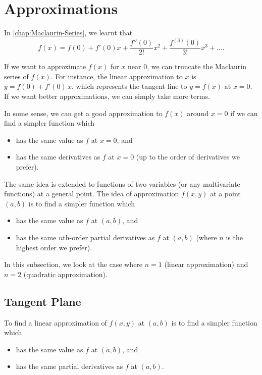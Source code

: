 \section{Approximations}

In \SS\ref{chap:Maclaurin-Series}, we learnt that \[f(x) = f(0) + f'(0) x + \frac{f''(0)}{2!} x^2 + \frac{f^{(3)}(0)}{3!} x^3 + \dots.\]

If we want to approximate $f(x)$ for $x$ near $0$, we can truncate the Maclaurin series of $f(x)$. For instance, the linear approximation to $x$ is $y = f(0) + f'(0) \, x$, which represents the tangent line to $y = f(x)$ at $x = 0$. If we want better approximations, we can simply take more terms.

In some sense, we can get a good approximation to $f(x)$ around $x = 0$ if we can find a simpler function which
\begin{itemize}
    \item has the same value as $f$ at $x = 0$, and
    \item has the same derivatives as $f$ at $x = 0$ (up to the order of derivatives we prefer).
\end{itemize}

The same idea is extended to functions of two variables (or any multivariate functions) at a general point. The idea of approximation $f(x, y)$ at a point $(a, b)$ is to find a simpler function which
\begin{itemize}
    \item has the same value as $f$ at $(a, b)$, and
    \item has the same $n$th-order partial derivatives as $f$ at $(a, b)$ (where $n$ is the highest order we prefer).
\end{itemize}

In this subsection, we look at the case where $n = 1$ (linear approximation) and $n = 2$ (quadratic approximation).

\subsection{Tangent Plane}

To find a linear approximation of $f(x, y)$ at $(a, b)$ is to find a simpler function which
\begin{itemize}
    \item has the same value as $f$ at $(a, b)$, and
    \item has the same partial derivatives as $f$ at $(a, b)$.
\end{itemize}

